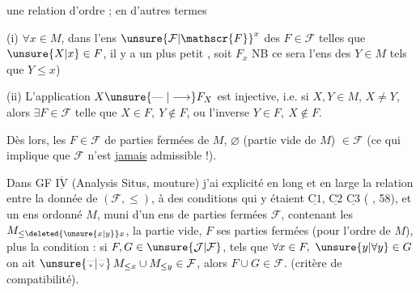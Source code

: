 une relation d'ordre ; en d'autres termes

(i) $\forall x\in M$, dans l'ens ${\unsure{\mathcal{F}|\mathscr{F}}}^{x}$ des $F\in\mathcal{F}$ telles que $\unsure{X|x}\in F$, il y a un plus petit , soit $F_{x}$ \unsure{[|(}NB ce sera l'ens des $Y\in M$ tels que $Y\leq x$)

(ii) L'application $X\unsure{\mathrel{\text{---}}|\longrightarrow} F_{X}$ est injective, i.e. si $X,Y\in M$, $X\ne Y$, alors $\exists F\in\mathcal{F}$ telle que $X\in F,\ Y\notin F$, ou l'inverse $Y\in F,\ X\notin F$.

Dès lors, les $F\in\mathcal{F}$   de parties fermées de $M$,    $\varnothing$ (partie vide de $M$) $\in\mathcal{F}$ (ce qui implique que $\mathcal{F}$ n'est \uline{jamais} admissible !).

Dans GF $\overline{\underline{\mathrm{IV}}}$ (Analysis Situs,  mouture) j'ai explicité en long et en large la relation entre la donnée de $(\mathcal{F},\leq)$,  à des conditions qui y étaient  $\underline{\mathrm{C1}}$, $\underline{\mathrm{C2}}$ $\underline{\mathrm{C3}}$ (  , 58),
 et un ens ordonné $M$, muni d'un ens de parties fermées $\mathcal{F}$, contenant les $M_{\leq \deleted{\unsure{x|y}}x}$, la partie vide,    $F$ ses parties fermées (pour l'ordre de $M$), plus la condition : si $F,G\in\unsure{\mathcal{J}|\mathcal{F}}$, tels que $\forall x\in F,\ \unsure{y|\forall y}\in G$ on ait $\unsure{\overset{\scriptscriptstyle\cdots}{\scriptscriptstyle v}|\overset{\scriptscriptstyle\cdots}{\scriptscriptstyle\vee}}\,M_{\leq x}\cup M_{\leq y}\in\mathcal{F}$, alors $F\cup G\in\mathcal{F}$. (critère de compatibilité).
